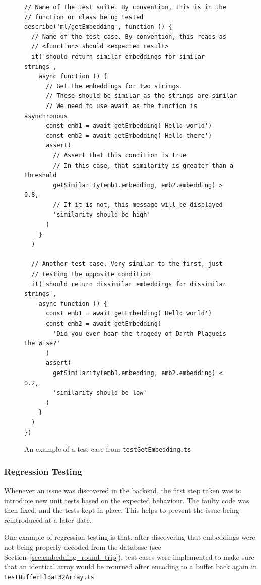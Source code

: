 \begin{figure}[p]
    \caption{\label{fig:test_case}An example of a test case from \texttt{testGetEmbedding.ts}}
    \begin{verbatim}
// Name of the test suite. By convention, this is in the
// function or class being tested
describe('ml/getEmbedding', function () {
  // Name of the test case. By convention, this reads as
  // <function> should <expected result>
  it('should return similar embeddings for similar strings',
    async function () {
      // Get the embeddings for two strings.
      // These should be similar as the strings are similar
      // We need to use await as the function is asynchronous
      const emb1 = await getEmbedding('Hello world')
      const emb2 = await getEmbedding('Hello there')
      assert(
        // Assert that this condition is true
        // In this case, that similarity is greater than a threshold
        getSimilarity(emb1.embedding, emb2.embedding) > 0.8,
        // If it is not, this message will be displayed
        'similarity should be high'
      )
    }
  )

  // Another test case. Very similar to the first, just
  // testing the opposite condition
  it('should return dissimilar embeddings for dissimilar strings',
    async function () {
      const emb1 = await getEmbedding('Hello world')
      const emb2 = await getEmbedding(
        'Did you ever hear the tragedy of Darth Plagueis the Wise?'
      )
      assert(
        getSimilarity(emb1.embedding, emb2.embedding) < 0.2,
        'similarity should be low'
      )
    }
  )
})
    \end{verbatim}
\end{figure}

\subsubsection{Regression Testing}

Whenever an issue was discovered in the backend, the first step taken was to
introduce new unit tests based on the expected behaviour. The faulty code was
then fixed, and the tests kept in place. This helps to prevent the issue being
reintroduced at a later date.

One example of regression testing is that, after discovering that embeddings were
not being properly decoded from the database (see Section~\ref{sec:embedding_round_trip}),
test cases were implemented to make sure that an identical array would be returned
after encoding to a buffer back again in \texttt{testBufferFloat32Array.ts}

